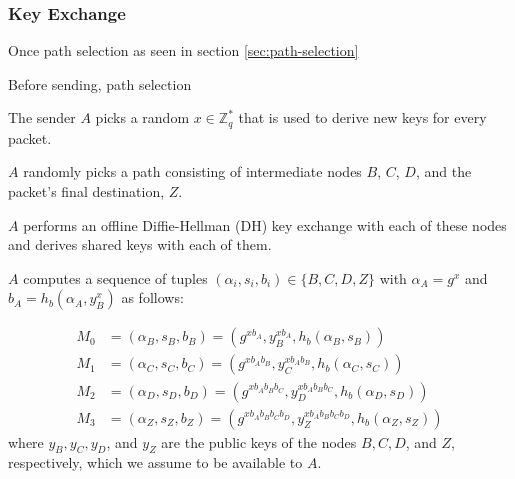 \subsubsection{Key Exchange}
\label{sec:sphinx:keyderivation}

Once path selection as seen in section \ref{sec:path-selection}

Before sending, path selection


The sender $A$ picks a random $x\in \mathbb{Z}^*_q$ that is used to derive new keys for every packet.

$A$ randomly picks a path consisting of intermediate nodes $B$, $C$, $D$, and the packet's final destination, $Z$.

$A$ performs an offline Diffie-Hellman (DH) key exchange with each of these nodes and derives shared keys with each of them.

$A$ computes a sequence of tuples $(\alpha_i,s_i,b_i) \in \{ B, C, D, Z \}$ with $\alpha_A = g^x$ and $b_A = h_b(\alpha_A, y_B^{x})$ as follows:

\begin{align}
    \nonumber M_0 & =(\alpha_B,s_B,b_B) = (g^{x b_A},y_B^{x b_A},h_b(\alpha_B,s_B))                                   \\
    \nonumber M_1 & =(\alpha_C,s_C,b_C) = (g^{x b_A b_B},y_C^{x b_A b_B},h_b(\alpha_C,s_C))                           \\
    \nonumber M_2 & =(\alpha_D,s_D,b_D) = (g^{x b_A b_B b_C},y_D^{x b_A b_B b_C},h_b(\alpha_D,s_D))                   \\
    \nonumber M_3 & =(\alpha_Z,s_Z,b_Z)           = (g^{x b_A b_B b_C b_D},y_Z^{x b_A b_B b_C b_D},h_b(\alpha_Z,s_Z))
\end{align}
where $y_B, y_C, y_D$, and $y_Z$ are the public keys of the nodes $B, C, D$, and $Z$, respectively, which we assume to be available to $A$.

